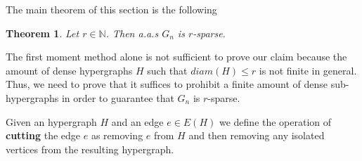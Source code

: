 \documentclass[12pt,notitlepage,a4paper]{article}
\newtheorem{theorem}{Theorem}[section]
\newtheorem{lemma}{Lemma}[section]
\theoremstyle{definition}
\newcommand{\N}{\mathbb{N}}
\begin{document}
%

The main theorem of this section is the following
\begin{theorem} \label{thm:sparse}
	Let $r\in \N$. Then a.a.s $G_n$ is $r$-sparse. 
\end{theorem}

	The first moment method alone is not sufficient
	to prove our claim because the amount of dense 
	hypergraphs	$H$ such that $diam(H)\leq r$ is not finite
	in general. Thus, we need to prove that it suffices to
	prohibit a finite amount of dense sub-hypergraphs in order
	to guarantee that $G_n$ is $r$-sparse.\par
	Given an hypergraph $H$ and an edge $e\in E(H)$ we
	define the operation of \textbf{cutting} the edge 
	$e$ as removing $e$ from $H$ and then removing any isolated
	vertices from the resulting hypergraph. \par
\end{document}
